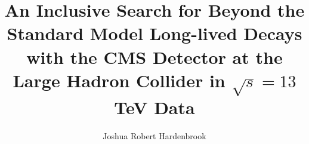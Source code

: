 \documentclass[12pt,lot, lof]{puthesis}
\title{An Inclusive Search for Beyond the Standard Model Long-lived Decays with the CMS Detector at the Large Hadron Collider in $\sqrt{s}=13$ TeV Data  }
\author{Joshua Robert Hardenbrook}
\begin{document}


\makefrontmatter


\newcommand{\Hgg}{\ensuremath{H\to\gamma\gamma}}
\newcommand{\Hbb}{\ensuremath{H\to b\bar{b}}}
\newcommand{\ggbb}{\ensuremath{\gamma\gamma b\bar{b}}}
\newcommand{\ggjj}{\ensuremath{\gamma\gamma jj}}
\newcommand{\gjjj}{\ensuremath{\gamma jjj}}
\newcommand{\Mgg}{\ensuremath{m_{\gamma\gamma}}}
\newcommand{\Mjj}{\ensuremath{m_{jj}}}
\newcommand{\Mjjr}{\ensuremath{m_{jj}^{\rm r}}}
\newcommand{\thetastar}{\ensuremath{\theta^{\rm CS}_{HH}}}
\newcommand{\acosthetastar}{\ensuremath{|\cos {\theta^{\rm CS}_{HH}}|}}
\newcommand{\Mggjj}{\ensuremath{m_{\gamma\gamma jj}}}
\newcommand{\Mggjjk}{\ensuremath{m_{\gamma\gamma jj}^{\rm kin}}}
\newcommand{\Mggjjrk}{\ensuremath{m_{\gamma\gamma jj}^{\rm r, kin}}}
\newcommand{\pTj}{\ensuremath{p_{T, j}}}
\newcommand{\pTjr}{\ensuremath{p_{T, j}^r}}
\newcommand{\kapt}{\ensuremath{\kappa_{t}}}
\newcommand{\kapl}{\ensuremath{\kappa_{\lambda}}}
\newcommand{\ctwo}{\ensuremath{c_2}}
\newcommand{\sieie}{\ensuremath{\sigma_{i\eta i\eta}}}
\newcommand{\met}{\ensuremath{{\not\mathrel{E}}_{\text{T}}}}











\appendix %
%
%

\singlespacing


\cleardoublepage
\ifdefined{}
\else
\fi
{}


\end{document}
